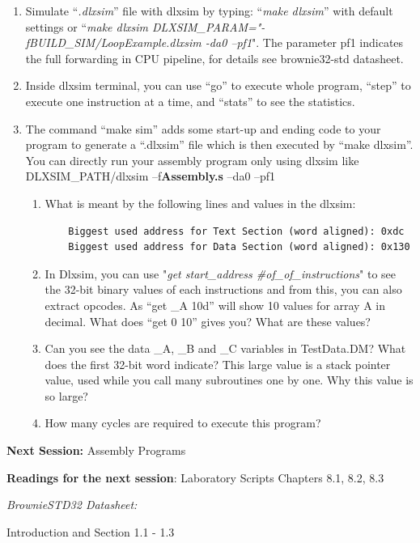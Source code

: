 \begin{enumerate}
\begin{enumerate}
	\item Simulate ``\emph{.dlxsim}'' file with dlxsim by typing: ``\emph{make dlxsim}'' with default settings or ``\emph{make dlxsim DLXSIM\_PARAM="-fBUILD\_SIM/LoopExample.dlxsim -da0 --pf1}". The parameter pf1 indicates the full forwarding in CPU pipeline, for details see brownie32-std datasheet.
	\item Inside dlxsim terminal, you can use ``go'' to execute whole program, ``step'' to execute one instruction at a time, and ``stats'' to see the statistics.
	\item The command ``make sim'' adds some start-up and ending code to your program to generate a ``.dlxsim'' file which is then executed by ``make dlxsim''. You can directly run your assembly program only using dlxsim like DLXSIM\_PATH/dlxsim --f\textbf{Assembly.s} --da0 --pf1
	\begin{enumerate}[label=(\alph*)]
	\color{red}\item\normalcolor  What is meant by the following lines and values in the dlxsim:
	\begin{lstlisting}
	Biggest used address for Text Section (word aligned): 0xdc
	Biggest used address for Data Section (word aligned): 0x130
	\end{lstlisting}
	\color{red}\item\normalcolor  In Dlxsim, you can use "\emph{get start\_address \#of\_of\_instructions}" to see the 32-bit binary values of each instructions and from this, you can also extract opcodes. As ``get \_A 10d'' will show 10 values for array A in decimal. What does ``get 0
	10'' gives you? What are these values?
	\color{red}\item\normalcolor  Can you see the data \_A, \_B and \_C variables in TestData.DM? What does the first 32-bit word indicate? This large value is a stack pointer value, used while you call many subroutines one by one. Why this value is so large?
	\color{red}\item\normalcolor  How many cycles are required to execute this program?
	\end{enumerate}
\end{enumerate}
\end{enumerate}


	\textbf{Next Session:} Assembly Programs
	
	\textbf{Readings for the next session}: Laboratory Scripts Chapters 8.1, 8.2,
	8.3
	
	\textit{BrownieSTD32 Datasheet:}
	
	Introduction and Section 1.1 - 1.3
	
